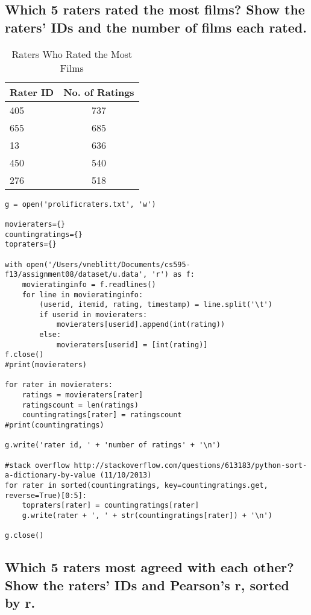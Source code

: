 \documentclass{article}
\begin{document}
\newpage
\subsection{Which 5 raters rated the most films? Show the raters' IDs and the number of films each rated.}

\begin{table}[!h]
\centering
\begin{tabular}{l c}
Rater ID & No. of Ratings \\
\hline
405 & 737  \\
655 & 685  \\
13 & 636  \\
450 & 540  \\
276 & 518  \\
\hline
\end{tabular}
\caption{Raters Who Rated the Most Films}
\end{table}

\begin{lstlisting}[frame=single, caption=prolificraters.py, label=prolificraters]
g = open('prolificraters.txt', 'w')

movieraters={}
countingratings={}
topraters={}

with open('/Users/vneblitt/Documents/cs595-f13/assignment08/dataset/u.data', 'r') as f:
	movieratinginfo = f.readlines()
	for line in movieratinginfo:
		(userid, itemid, rating, timestamp) = line.split('\t')
		if userid in movieraters:
			movieraters[userid].append(int(rating))
		else:
			movieraters[userid] = [int(rating)]
f.close()
#print(movieraters)

for rater in movieraters:
	ratings = movieraters[rater]
	ratingscount = len(ratings)
	countingratings[rater] = ratingscount
#print(countingratings)

g.write('rater id, ' + 'number of ratings' + '\n')

#stack overflow http://stackoverflow.com/questions/613183/python-sort-a-dictionary-by-value (11/10/2013)
for rater in sorted(countingratings, key=countingratings.get, reverse=True)[0:5]:
	topraters[rater] = countingratings[rater]
	g.write(rater + ', ' + str(countingratings[rater]) + '\n')

g.close()
\end{lstlisting}

\newpage
\subsection{Which 5 raters most agreed with each other? Show the raters' IDs and Pearson's r, sorted by r.}
\end{document}
